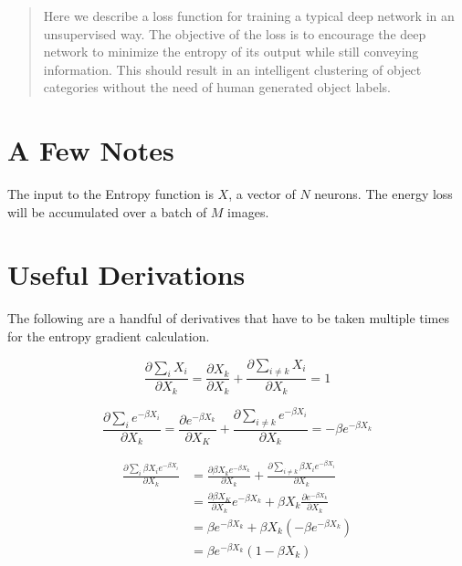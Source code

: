 \begin{abstract}
Here we describe a loss function for training a typical deep network in an unsupervised way. The objective of the loss is to encourage the deep network to minimize the entropy of its output while still conveying information. This should result in an intelligent clustering of object categories without the need of human generated object labels.
\end{abstract}

\section{A Few Notes} \label{notes}
\noindent The input to the Entropy function is $X$, a vector of $N$ neurons. The energy loss will be accumulated over a batch of $M$ images.

\section{Useful Derivations} \label{derivatives}
\noindent The following are a handful of derivatives that have to be taken multiple times for the entropy gradient calculation.

\begin{equation}
    \frac{\partial\sum_{i}X_i}{\partial X_{k}} = \frac{\partial X_{k}}{\partial X_{k}} + \frac{\partial \sum_{i \ne k} X_{i}}{\partial X_{k}} = 1
\label{dx}
\end{equation}

\begin{equation}
    \frac{\partial \sum_{i}e^{-\beta X_{i}}}{\partial X_{k}} = \frac{\partial e^{-\beta X_{k}}}{\partial X_{K}} + \frac{\partial \sum_{i \ne k} e^{-\beta X_{i}}}{\partial X_{k}} = -\beta e^{-\beta X_{k}}
\label{dex}
\end{equation}

\begin{equation}
\begin{aligned} 
    \frac{\partial \sum_{i}\beta X_{i} e^{-\beta X_{i}}}{\partial X_{k}} 
    &= \frac{\partial \beta X_{k} e^{-\beta X_{k}}}{\partial X_{k}} + \frac{\partial \sum_{i \ne k} \beta X_{i} e^{-\beta X_{i}}}{\partial X_{k}} \\
    &= \frac{\partial \beta X_{K}}{\partial X_{k}} e^{-\beta X_{k}} + \beta X_{k} \frac{\partial e^{-\beta X_{k}}}{\partial X_{k}}\\
    &= \beta e^{-\beta X_{k}} + \beta X_{k} (-\beta e^{-\beta X_{k}})\\
    &= \beta e^{-\beta X_{k}}(1 - \beta X_{k})
\label{dxex}
\end{aligned}
\end{equation}

